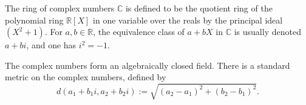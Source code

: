 \documentclass{article}
\begin{document}
The ring of complex numbers $\mathbb{C}$ is defined to be the quotient ring of the polynomial ring $\mathbb{R}[X]$ in one variable over the reals by the principal ideal $(X^2+1)$. For $a,b \in \mathbb{R}$, the equivalence class of $a+bX$ in $\mathbb{C}$ is usually denoted $a+bi$, and one has $i^2 = -1$.

The complex numbers form an algebraically closed field. There is a standard metric on the complex numbers, defined by
$$
d(a_1+b_1 i, a_2+b_2 i) := \sqrt{(a_2-a_1)^2 + (b_2-b_1)^2}.
$$
\end{document}
